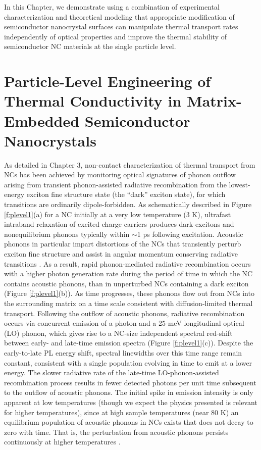 In this Chapter, we demonstrate using a combination of experimental characterization and theoretical modeling that appropriate modification of semiconductor nanocrystal surfaces can manipulate thermal transport rates independently of optical properties and improve the thermal stability of semiconductor NC materials at the single particle level.

\section{Particle-Level Engineering of Thermal Conductivity in Matrix-Embedded Semiconductor Nanocrystals}

As detailed in Chapter 3, non-contact characterization of thermal transport from NCs has been achieved by monitoring optical signatures of phonon outflow arising from transient phonon-assisted radiative recombination from the lowest-energy exciton fine structure state (the “dark” exciton state), for which transitions are ordinarily dipole-forbidden. As schematically described in Figure \ref{f:plevel1}(a) for a NC initially at a very low temperature (3 K), ultrafast intraband relaxation of excited charge carriers produces dark-excitons and nonequilibrium phonons typically within $\sim$1 ps following excitation. Acoustic phonons in particular impart distortions of the NCs that transiently perturb exciton fine structure and assist in angular momentum conserving radiative transitions \cite{:/content/aip/journal/jcp/132/10/10.1063/1.3350871,doi:10.1021/jp201408m}. As a result, rapid phonon-mediated radiative recombination occurs with a higher photon generation rate during the period of time in which the NC contains acoustic phonons, than in unperturbed NCs containing a dark exciton (Figure \ref{f:plevel1}(b)).  As time progresses, these phonons flow out from NCs into the surrounding matrix on a time scale consistent with diffusion-limited thermal transport. Following the outflow of acoustic phonons, radiative recombination occurs via concurrent emission of a photon and a 25-meV longitudinal optical (LO) phonon, which gives rise to a NC-size independent spectral red-shift between early- and late-time emission spectra (Figure \ref{f:plevel1}(c)). Despite the early-to-late PL energy shift, spectral linewidths over this time range remain constant, consistent with a single population evolving in time to emit at a lower energy. The slower radiative rate of the late-time LO-phonon-assisted recombination process results in fewer detected photons per unit time subsequent to the outflow of acoustic phonons. The initial spike in emission intensity is only apparent at low temperatures (though we expect the physics presented is relevant for higher temperatures), since at high sample temperatures (near 80 K) an equilibrium population of acoustic phonons in NCs exists that does not decay to zero with time. That is, the perturbation from acoustic phonons persists continuously at higher temperatures \cite{PhysRevLett.107.177403}.


